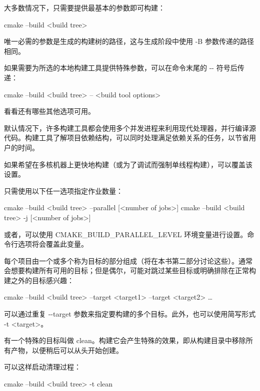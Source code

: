 大多数情况下，只需要提供最基本的参数即可构建：

\begin{shell}
cmake --build <build tree>
\end{shell}

唯一必需的参数是生成的构建树的路径，这与生成阶段中使用 -B 参数传递的路径相同。

如果需要为所选的本地构建工具提供特殊参数，可以在命令末尾的 -{}- 符号后传递：

\begin{shell}
cmake --build <build tree> -- <build tool options>
\end{shell}

看看还有哪些其他选项可用。


默认情况下，许多构建工具都会使用多个并发进程来利用现代处理器，并行编译源代码。构建工具了解项目依赖结构，可以同时处理满足依赖关系的任务，以节省用户的时间。

如果希望在多核机器上更快地构建（或为了调试而强制单线程构建），可以覆盖该设置。

只需使用以下任一选项指定作业数量：

\begin{shell}
cmake --build <build tree> --parallel [<number of jobs>]
cmake --build <build tree> -j [<number of jobs>]
\end{shell}

或者，可以使用 CMAKE\_BUILD\_PARALLEL\_LEVEL 环境变量进行设置。命令行选项将会覆盖此变量。


每个项目由一个或多个称为目标的部分组成（将在本书第二部分讨论这些）。通常会想要构建所有可用的目标；但是偶尔，可能对跳过某些目标或明确排除在正常构建之外的目标感兴趣：

\begin{shell}
cmake --build <build tree> --target <target1> --target <target2> …
\end{shell}

可以通过重复 -{}-target 参数来指定要构建的多个目标。此外，也可以使用简写形式 -t <target>。


有一个特殊的目标叫做 clean。构建它会产生特殊的效果，即从构建目录中移除所有产物，以便稍后可以从头开始创建。

可以这样启动清理过程：

\begin{shell}
cmake --build <build tree> -t clean
\end{shell}

